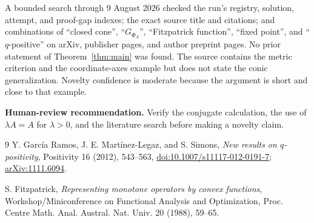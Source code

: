 \documentclass[11pt]{article}
\begin{document}
A bounded search through 9 August 2026 checked the run's registry, solution,
attempt, and proof-gap indexes; the exact source title and citations; and
combinations of ``closed cone'', ``$G_{\Phi_A}$'', ``Fitzpatrick function'',
``fixed point'', and ``$q$-positive'' on arXiv, publisher pages, and author
preprint pages. No prior statement of Theorem~\ref{thm:main} was found. The
source contains the metric criterion and the coordinate-axes example but does
not state the conic generalization. Novelty confidence is moderate because the
argument is short and close to that example.

\textbf{Human-review recommendation.} Verify the conjugate calculation,
the use of $\lambda A=A$ for $\lambda>0$, and the literature search before
making a novelty claim.

\begin{thebibliography}{9}
Y. Garc\'ia Ramos, J. E. Mart\'inez-Legaz, and S. Simons,
\emph{New results on $q$-positivity}, Positivity 16 (2012), 543--563,
\href{https://doi.org/10.1007/s11117-012-0191-7}{doi:10.1007/s11117-012-0191-7};
\href{https://arxiv.org/abs/1111.6094}{arXiv:1111.6094}.

S. Fitzpatrick,
\emph{Representing monotone operators by convex functions},
Workshop/Miniconference on Functional Analysis and Optimization,
Proc. Centre Math. Anal. Austral. Nat. Univ. 20 (1988), 59--65.
\end{thebibliography}
\end{document}
